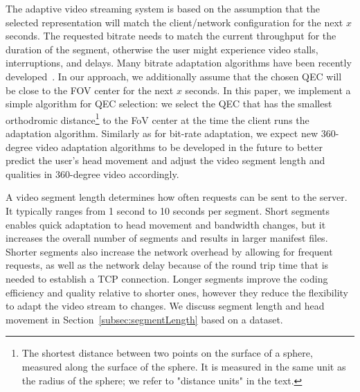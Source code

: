 The adaptive video streaming system is based on the assumption that
the selected representation will match the client/network
configuration for the next $x$ seconds. The requested bitrate needs to
match the current throughput for the duration of the segment,
otherwise the user might experience video stalls, interruptions, and
delays. Many bitrate adaptation algorithms have been recently
developed~\cite{tian,probe_li_2014,miller,zou,liu}. In our approach,
we additionally assume that the chosen QEC will be close to the FOV
center for the next $x$ seconds. In this paper, we implement a simple
algorithm for QEC selection: we select the QEC that has the smallest
orthodromic distance\footnote{The shortest distance between two points
on the surface of a sphere, measured along the surface of the sphere. It is measured in the same unit as the radius of the sphere; we refer to "distance units" in the text.}
to the FoV center at the time the client runs the adaptation
algorithm.
Similarly as for bit-rate adaptation, we expect new 360-degree video
adaptation algorithms to be developed in the future to better predict
the user's head movement and adjust the video segment length and
qualities in 360-degree video accordingly.


 A video segment length determines how
often requests can be sent to the server. It typically ranges from 1
second to 10 seconds per segment. Short segments enables quick
adaptation to head movement and bandwidth changes, but it increases
the overall number of segments and results in larger manifest files.
Shorter segments also increase the network overhead by allowing for
frequent requests, as well as the network delay because of the round
trip time that is needed to establish a TCP connection.
Longer segments improve the coding efficiency and quality relative to
shorter ones, however they reduce the flexibility to adapt the video
stream to changes. We discuss segment length and head movement in
Section~\ref{subsec:segmentLength} based on a dataset.


